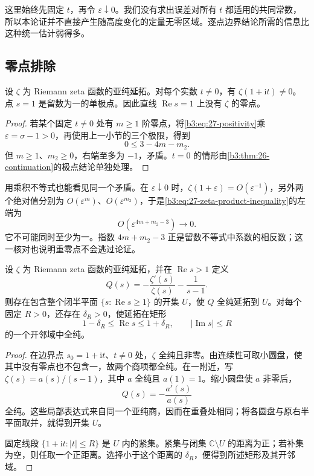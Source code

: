 这里始终先固定 \(t\)，再令 \(\varepsilon\downarrow0\)。我们没有求出误差对所有 \(t\) 都适用的共同常数，所以本论证并不直接产生随高度变化的定量无零区域。逐点边界结论所需的信息比这种统一估计弱得多。

\subsection{零点排除}
\label{b3:subsec:270304}

\begin{theorem}[实部一上的无零点性]\label{b3:thm:27-zero-free-line}
设 \(\zeta\) 为 Riemann zeta 函数的亚纯延拓。对每个实数 \(t\ne0\)，有 \(\zeta(1+\mathrm it)\ne0\)。点 \(s=1\) 是留数为一的单极点。因此直线 \(\operatorname{Re}s=1\) 上没有 \(\zeta\) 的零点。
\end{theorem}
\begin{proof}
若某个固定 \(t\ne0\) 处有 \(m\ge1\) 阶零点，将\eqref{b3:eq:27-positivity}乘 \(\varepsilon=\sigma-1>0\)，再使用上一小节的三个极限，得到
\[
 0\le3-4m-m_2.
\]
但 \(m\ge1\)、\(m_2\ge0\)，右端至多为 \(-1\)，矛盾。\(t=0\) 的情形由\cref{b3:thm:26-continuation}的极点结论单独处理。
\end{proof}

用乘积不等式也能看见同一个矛盾。在 \(\varepsilon\downarrow0\) 时，\(\zeta(1+\varepsilon)=O(\varepsilon^{-1})\)，另外两个绝对值分别为 \(O(\varepsilon^m)\)、\(O(\varepsilon^{m_2})\)，于是\eqref{b3:eq:27-zeta-product-inequality}的左端为
\[
 O(\varepsilon^{4m+m_2-3})\longrightarrow0.
\]
它不可能同时至少为一。指数 \(4m+m_2-3\) 正是留数不等式中系数的相反数；这一核对也说明重零点不会逃过论证。

\begin{corollary}[去主部后的边界延拓]\label{b3:cor:27-regularized-boundary}
设 \(\zeta\) 为 Riemann zeta 函数的亚纯延拓，并在 \(\operatorname{Re}s>1\) 定义
\[
 Q(s)=-\frac{\zeta'(s)}{\zeta(s)}-\frac1{s-1}.
\]
则存在包含整个闭半平面 \(\{s:\operatorname{Re}s\ge1\}\) 的开集 \(U\)，使 \(Q\) 全纯延拓到 \(U\)。对每个固定 \(R>0\)，还存在 \(\delta_R>0\)，使延拓在矩形
\[
 1-\delta_R\le\operatorname{Re}s\le1+\delta_R,
 \qquad |\operatorname{Im}s|\le R
\]
的一个开邻域中全纯。
\end{corollary}
\begin{proof}
在边界点 \(s_0=1+\mathrm it\)、\(t\ne0\) 处，\(\zeta\) 全纯且非零。由连续性可取小圆盘，使其中没有零点也不包含一，故两个商项都全纯。在一附近，写 \(\zeta(s)=a(s)/(s-1)\)，其中 \(a\) 全纯且 \(a(1)=1\)。缩小圆盘使 \(a\) 非零后，
\[
 Q(s)=-\frac{a'(s)}{a(s)}
\]
全纯。这些局部表达式来自同一个亚纯商，因而在重叠处相同；将各圆盘与原右半平面取并，就得到开集 \(U\)。

固定线段 \(\{1+\mathrm it:|t|\le R\}\) 是 \(U\) 内的紧集。紧集与闭集 \(\mathbb C\setminus U\) 的距离为正；若补集为空，则任取一个正距离。选择小于这个距离的 \(\delta_R\)，便得到所述矩形及其开邻域。
\end{proof}


